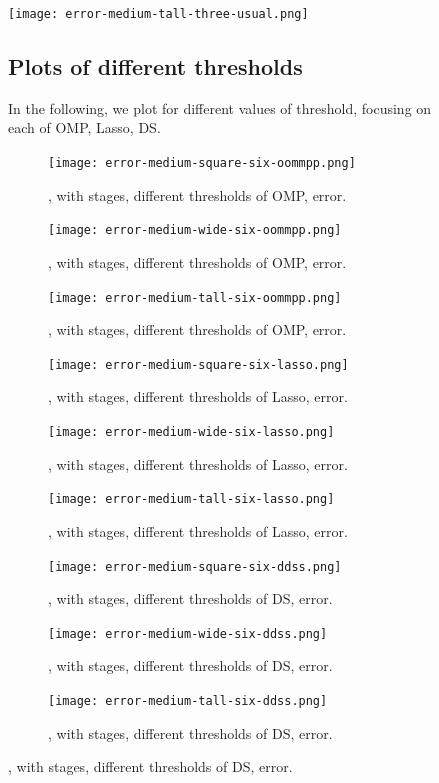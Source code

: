 \begin {figure} [H]
\texttt{[image: error-medium-tall-three-usual.png]}
\caption {, with  stages, error.}

\subsection {Plots of different thresholds}

In the following, we plot for different values of threshold, focusing on each of OMP, Lasso, DS.
%
\begin {figure} [H]
\texttt{[image: error-medium-square-six-oommpp.png]}
\caption {, with  stages, different thresholds of OMP, error.}
\end {figure}
%
\begin {figure} [H]
\texttt{[image: error-medium-wide-six-oommpp.png]}
\caption {, with  stages, different thresholds of OMP, error.}
\end {figure}
%
\begin {figure} [H]
\texttt{[image: error-medium-tall-six-oommpp.png]}
\caption {, with  stages, different thresholds of OMP, error.}
\end {figure}
%
\begin {figure} [H]
\texttt{[image: error-medium-square-six-lasso.png]}
\caption {, with  stages, different thresholds of Lasso, error.}
\end {figure}
%
\begin {figure} [H]
\texttt{[image: error-medium-wide-six-lasso.png]}
\caption {, with  stages, different thresholds of Lasso, error.}
\end {figure}
%
\begin {figure} [H]
\texttt{[image: error-medium-tall-six-lasso.png]}
\caption {, with  stages, different thresholds of Lasso, error.}
\end {figure}
%
\begin {figure} [H]
\texttt{[image: error-medium-square-six-ddss.png]}
\caption {, with  stages, different thresholds of DS, error.}
\end {figure}
%
\begin {figure} [H]
\texttt{[image: error-medium-wide-six-ddss.png]}
\caption {, with  stages, different thresholds of DS, error.}
\end {figure}
%
\begin {figure} [H]
\texttt{[image: error-medium-tall-six-ddss.png]}
\caption {, with  stages, different thresholds of DS, error.}
\end {figure}


\end{figure}
